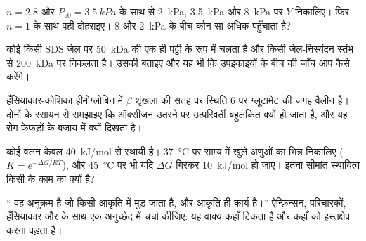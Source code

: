 \begin{exercise}[$\star\star$]\label{exo:b1:proteins:8}
$n = 2.8$ और $P_{50} = \qty{3.5}{kPa}$ के साथ  से
\qty{2}{kPa}, \qty{3.5}{kPa} और \qty{8}{kPa} पर $Y$ निकालिए। फिर
$n = 1$ के साथ वही दोहराइए। \qty{8}{} और \qty{2}{kPa} के बीच कौन-सा
 अधिक पहुँचाता है?
\end{exercise}

\begin{exercise}[$\star\star$]\label{exo:b1:proteins:9}
कोई  किसी SDS जेल पर \qty{50}{kDa} की एक ही पट्टी के रूप में
चलता है और किसी जेल-निस्यंदन स्तंभ से \qty{200}{kDa} पर निकलता है। उसकी
 बताइए और यह भी कि उपइकाइयों के बीच  की
जाँच आप कैसे करेंगे।
\end{exercise}

\begin{exercise}[$\star\star\star$]\label{exo:b1:proteins:10}
हँसियाकार-कोशिका हीमोग्लोबिन में $\beta$ शृंखला की सतह पर स्थिति 6 पर
ग्लूटामेट की जगह वैलीन है। दोनों  के रसायन से समझाइए कि
ऑक्सीजन उतरने पर उत्परिवर्ती  बहुलकित क्यों हो जाता है, और यह रोग
फेफड़ों के बजाय  में क्यों दिखता है।
\end{exercise}

\begin{exercise}[$\star\star\star$]\label{exo:b1:proteins:11}
कोई वलन केवल \qty{40}{kJ/mol} से स्थायी है। \qty{37}{\celsius} पर साम्य
में खुले अणुओं का भिन्न निकालिए ($K = e^{-\Delta G/RT}$),
और \qty{45}{\celsius} पर भी यदि $\Delta G$ गिरकर
\qty{10}{kJ/mol} हो जाए। इतना सीमांत स्थायित्व किसी  के काम का
क्यों है?
\end{exercise}

\begin{exercise}[$\star\star\star$]\label{exo:b1:proteins:12}
`` वह अनुक्रम है जो किसी आकृति में मुड़ जाता है, और आकृति ही
कार्य है।'' ऐन्फ़िन्सन, परिचारकों, हँसियाकार  और  के
साथ एक अनुच्छेद में चर्चा कीजिए: यह वाक्य कहाँ टिकता है और कहाँ  को
हस्तक्षेप करना पड़ता है।
\end{exercise}

